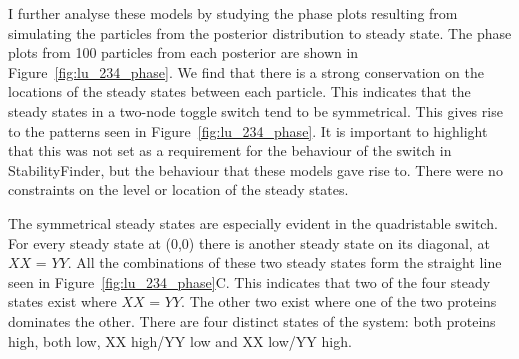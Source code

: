 


I further analyse these models by studying the phase plots resulting from simulating the particles from the posterior distribution to steady state. The phase plots from 100 particles from each posterior are shown in Figure~\ref{fig:lu_234_phase}. We find that there is a strong conservation on the locations of the steady states between each particle. This indicates that the steady states in a two-node toggle switch tend to be symmetrical. This gives rise to the patterns seen in Figure~\ref{fig:lu_234_phase}. It is important to highlight that this was not set as a requirement for the behaviour of the switch in StabilityFinder, but the behaviour that these models gave rise to. There were no constraints on the level or location of the steady states. 

The symmetrical steady states are especially evident in the quadristable switch.  For every steady state at (0,0) there is another steady state on its diagonal, at $XX$ = $YY$. All the combinations of these two steady states form the straight line seen in Figure~\ref{fig:lu_234_phase}C. This indicates that two of the four steady states exist where $XX$ = $YY$. The other two exist where one of the two proteins dominates the other.  There are four distinct states of the system: both proteins high, both low, XX high/YY low and XX low/YY high. 


